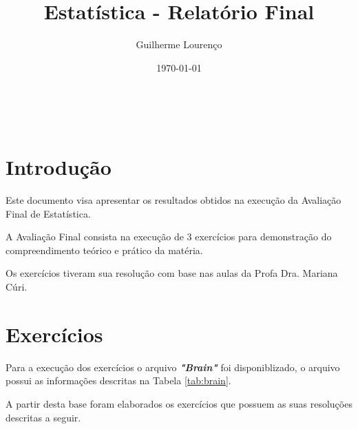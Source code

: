 \documentclass[12pt, a4paper]{article}
\title{Estatística - Relatório Final}
\author{Guilherme Lourenço}
\date{\today}
\newcommand{\professora}{Profa Dra. Mariana Cúri}
\begin{document}
	
	\maketitle\
	
	\tableofcontents
	
	\section{Introdução}
    Este documento visa apresentar os resultados obtidos na execução da Avaliação Final de Estatística.
    
    A Avaliação Final consista na execução de 3 exercícios para demonstração do compreendimento teórico e prático da matéria.
    
    Os exercícios tiveram sua resolução com base nas aulas da \professora.
    
    \section{Exercícios}
    Para a execução dos exercícios o arquivo  \textbf{\textit{"Brain"}} foi disponiblizado, o arquivo possui as informações descritas na Tabela \ref{tab:brain}.
        
    \begin{table}[]
    \caption{Arquivo: Brain}
    \label{tab:brain}
    \end{table}
    \break
        
    A partir desta base foram elaborados os exercícios que possuem as suas resoluções descritas a seguir.\\
    
\end{document}
